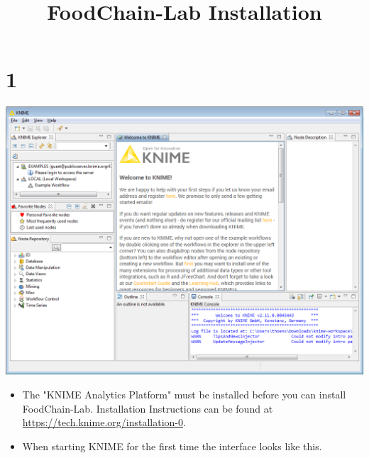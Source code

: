 \documentclass{beamer}
\title{FoodChain-Lab Installation}
\date{}
\begin{document}
\maketitle
 
\section{1}
\begin{frame}
	\begin{center}
  		\includegraphics[height=0.6\textheight]{1.png}
	\end{center}
	\begin{itemize}
		\item The "KNIME Analytics Platform" must be installed before you can install FoodChain-Lab. Installation Instructions can be found at \url{https://tech.knime.org/installation-0}.
		\item When starting KNIME for the first time the interface looks like this.
	\end{itemize}
\end{frame}
\end{document}
